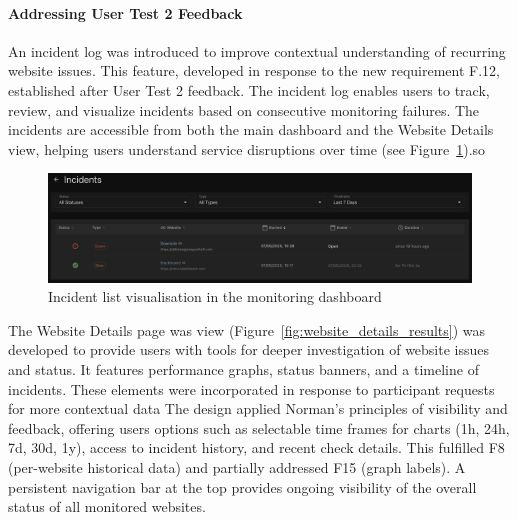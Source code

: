 \paragraph{Addressing User Test 2 Feedback}

An incident log was introduced to improve contextual understanding of recurring website issues. This feature, developed in response to the new requirement F.12, established after User Test 2 feedback. The incident log enables users to track, review, and visualize incidents based on consecutive monitoring failures. The incidents are accessible from both the main dashboard and the Website Details view, helping users understand service disruptions over time (see Figure~\ref{fig:incident_list}).so

\begin{figure}[H]
\centering
\includegraphics[width=1\textwidth]{figures/IncidentList.png}
\caption{Incident list visualisation in the monitoring dashboard}
\label{fig:incident_list}
\end{figure}



The Website Details page was view (Figure~\ref{fig:website_details_results}) was developed to provide users with tools for deeper investigation of website issues and status. It features performance graphs, status banners, and a timeline of incidents. These elements were incorporated in response to participant requests for more contextual data  The design applied Norman’s principles of visibility and feedback, offering users options such as selectable time frames for charts (1h, 24h, 7d, 30d, 1y), access to incident history, and recent check details. This fulfilled F8 (per-website historical data) and partially addressed F15 (graph labels). A persistent navigation bar at the top provides ongoing visibility of the overall status of all monitored websites.



